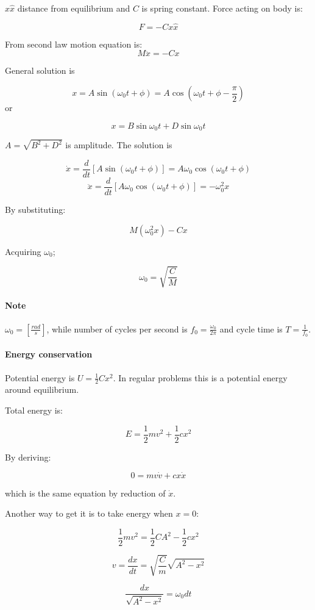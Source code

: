 $x\hat{x}$ distance from equilibrium and $C$ is spring constant. Force acting on body is:

$$F = - Cx\hat{x}$$

From second law motion equation is: 
$$M\ddot{x} = - Cx$$

General solution is

$$x = A \sin\left(\omega_0 t + \phi \right) = A \cos\left(\omega_0 t + \phi - \frac{\pi}{2} \right)$$
or

$$x = B \sin \omega_0 t + D \sin \omega_0 t$$

$A=\sqrt{B^2+D^2}$ is amplitude. The solution is

$$\dot{x} = \frac{d}{dt} \left[ A \sin \left( \omega_0 t  +\phi \right) \right] = A\omega_0 \cos  \left( \omega_0 t  +\phi \right)$$
$$\ddot{x}  = \frac{d}{dt} \left[ A\omega_0 \cos  \left( \omega_0 t  +\phi \right) \right] = -\omega_0^2 x$$

By substituting:

$$M\left( \omega_0^2 x \right) - Cx$$

Acquiring $\omega_0$;

$$\omega_0 = \sqrt{\frac{C}{M}}$$ 

\paragraph{Note} $\omega_0 = \left[ \frac{rad}{s} \right]$, while number of cycles per second is $f_0 = \frac{\omega_0}{2\pi}$ and cycle time is $T = \frac{1}{f_0}$.

\paragraph{Energy conservation} Potential energy is $U = \frac{1}{2}Cx^2$. In regular problems this is a potential energy around equilibrium.

Total energy is:

$$E = \frac{1}{2}mv^2  + \frac{1}{2}cx^2$$

By deriving:

$$ 0 = mv\dot{v} + cx\dot{x} $$

which is the same equation by reduction of $\dot{x}$.

Another way to get it is to take energy when $x=0$:

$$\frac{1}{2}mv^2 = \frac{1}{2}CA^2 - \frac{1}{2}cx^2$$

$$v= \frac{dx}{dt} = \sqrt{\frac{C}{m}} \sqrt{A^2 - x^2}$$

$$\frac{dx}{\sqrt{A^2-x^2}} = \omega_0 dt$$

